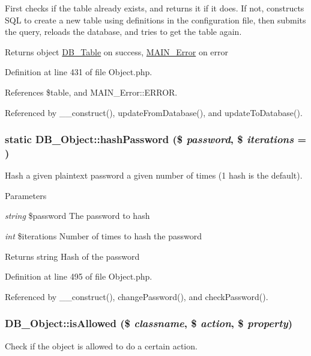 First checks if the table already exists, and returns it if it does. If not, constructs SQL to create a new table using definitions in the configuration file, then submits the query, reloads the database, and tries to get the table again.

\begin{DoxyReturn}{Returns}
object \hyperlink{classDB__Table}{DB\_\-Table} on success, \hyperlink{classMAIN__Error}{MAIN\_\-Error} on error 
\end{DoxyReturn}


Definition at line 431 of file Object.php.

References \$table, and MAIN\_\-Error::ERROR.

Referenced by \_\-\_\-construct(), updateFromDatabase(), and updateToDatabase().\hypertarget{classDB__Object_a8438909f696e1bb56d19eb617ef3f648}{
\subsubsection[{hashPassword}]{\setlength{\rightskip}{0pt plus 5cm}static DB\_\-Object::hashPassword (\$ {\em password}, \/  \$ {\em iterations} = {})}}
\label{dc/d6d/classDB__Object_a8438909f696e1bb56d19eb617ef3f648}
Hash a given plaintext password a given number of times (1 hash is the default).


\begin{DoxyParams}{Parameters}
\item[{\em string}]\$password The password to hash \item[{\em int}]\$iterations Number of times to hash the password\end{DoxyParams}
\begin{DoxyReturn}{Returns}
string Hash of the password 
\end{DoxyReturn}


Definition at line 495 of file Object.php.

Referenced by \_\-\_\-construct(), changePassword(), and checkPassword().\hypertarget{classDB__Object_ad323cdf42e524a6dccb1460c26d1a682}{
\subsubsection[{isAllowed}]{\setlength{\rightskip}{0pt plus 5cm}DB\_\-Object::isAllowed (\$ {\em classname}, \/  \$ {\em action}, \/  \$ {\em property})}}
\label{dc/d6d/classDB__Object_ad323cdf42e524a6dccb1460c26d1a682}
Check if the object is allowed to do a certain action.


